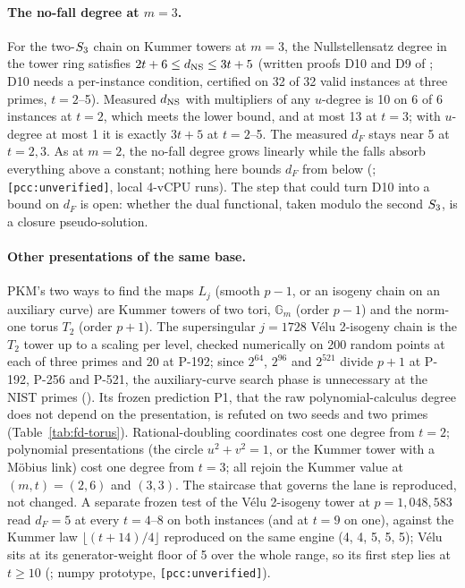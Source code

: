 \paragraph{The no-fall degree at $m=3$.} For the two-$S_{3}$ chain on
Kummer towers at $m=3$, the Nullstellensatz degree in the tower ring
satisfies $2t+6\le d_{\rm NS}\le3t+5$ (written proofs D10 and D9 of
; D10 needs a
per-instance condition, certified on 32 of 32 valid instances at three
primes, $t=2$--5). Measured $d_{\rm NS}$ with multipliers of any $u$-degree
is 10 on 6 of 6 instances at $t=2$, which meets the lower bound, and at
most 13 at $t=3$; with $u$-degree at most 1 it is exactly $3t+5$ at
$t=2$--5. The measured $d_F$ stays near 5 at $t=2,3$. As at $m=2$, the no-fall
degree grows linearly while the falls absorb everything above a constant;
nothing here bounds $d_F$ from below
(;
\texttt{[pcc:unverified]}, local 4-vCPU runs). The step that could turn D10 into a bound on
$d_F$ is open: whether the dual functional, taken modulo the second
$S_{3}$, is a closure pseudo-solution.

\paragraph{Other presentations of the same base.} PKM's two ways to find
the maps $L_j$ (smooth $p-1$, or an isogeny chain on an auxiliary curve) are
Kummer towers of two tori, $\mathbb{G}_m$ (order $p-1$) and the norm-one
torus $T_2$ (order $p+1$). The supersingular $j=1728$ Vélu 2-isogeny chain
is the $T_2$ tower up to a scaling per level, checked numerically on 200
random points at each of three primes and 20 at P-192; since $2^{64}$, $2^{96}$ and $2^{521}$
divide $p+1$ at P-192, P-256 and P-521, the auxiliary-curve search phase
is unnecessary at the NIST primes
(). Its frozen prediction
P1, that the raw polynomial-calculus degree does not depend on the
presentation, is refuted on two seeds and two primes
(Table~\ref{tab:fd-torus}). Rational-doubling coordinates cost one degree
from $t=2$; polynomial presentations (the circle $u^2+v^2=1$, or the
Kummer tower with a Möbius link) cost one degree from $t=3$; all rejoin the
Kummer value at $(m,t)=(2,6)$ and $(3,3)$. The staircase that governs the
lane is reproduced, not changed. A separate frozen test of the Vélu 2-isogeny tower at $p=1{,}048{,}583$ read
$d_F=5$ at every $t=4$--8 on both instances (and at $t=9$ on one), against
the Kummer law $\lfloor(t+14)/4\rfloor$ reproduced on the same engine
(4, 4, 5, 5, 5); Vélu sits at its generator-weight floor of 5 over the whole
range, so its first step lies at $t\ge10$
(;
numpy prototype, \texttt{[pcc:unverified]}).

